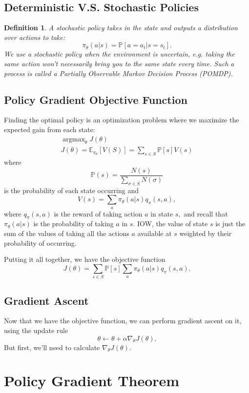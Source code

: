 \documentclass[17pt]{extarticle}
\theoremstyle{plain}
\newtheorem{definition}[theorem]{Definition}
\theoremstyle{definition}
\theoremstyle{remark}
\DeclareMathOperator{\argmax}{argmax}
\newcommand{\hE}{\mathbb E}
\newcommand{\hP}{\mathbb P}
\newcommand{\0}{\varnothing}
\newcommand{\<}{\langle}
\renewcommand{\>}{\rangle}
\begin{document}
\subsection{Deterministic V.S. Stochastic Policies}

\begin{definition}
  A stochastic policy takes in the state and outputs a distribution over actions to take: $$
  \pi_\theta(a|s) = \hP[a = a_t | s = s_t].
$$ We use a stochastic policy when the environment is uncertain, e.g. taking the same action won't necessarily bring you to the same state every time. Such a process is called a Partially Observable Markov Decision Process (POMDP).
\end{definition}

\subsection{Policy Gradient Objective Function}

Finding the optimal policy is an optimization problem where we maximize the expected gain from each state:
\begin{gather*}
\argmax_\theta  J(\theta) \\
J(\theta) = \hE_{\pi_\theta}[V(S)] = \sum_{s\in S} \hP[s] V(s)
\end{gather*}
where $$
  \hP(s) = \frac{N(s)}{\sum_{\sigma\in S} N(\sigma)}
$$
is the probability of each state occurring and $$
  V(s) = \sum_{a} \pi_\theta(a|s) q_\pi(s, a),
$$
where $ q_\pi(s, a) $ is the reward of taking action $ a $ in state $ s, $ and recall that $ \pi_\theta(a|s) $ is the probability of taking $ a $ in $ s. $ IOW, the value of state $ s $ is just the sum of the values of taking all the actions $ a $ available at $ s $ weighted by their probability of occurring.

Putting it all together, we have the objective function $$
J(\theta) = \sum_{s\in S} \hP[s] \sum_{a} \pi_\theta(a|s) q_\pi(s, a).
$$

\subsection{Gradient Ascent}

Now that we have the objective function, we can perform gradient ascent on it, using the update rule $$
  \theta \gets \theta + \alpha \nabla_\theta J(\theta).
$$
But first, we'll need to calculate $ \nabla_\theta J(\theta). $

\section{Policy Gradient Theorem}
\end{document}

